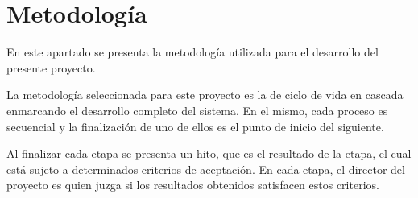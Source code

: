 \section{Metodología}

    \par
    En este apartado se presenta la metodología utilizada para el desarrollo del presente proyecto.
    \par La metodología seleccionada para este proyecto es la de ciclo de vida en cascada enmarcando el desarrollo completo del sistema. En el mismo, cada proceso es secuencial y la finalización de uno de ellos es el punto de inicio del siguiente.
    
    \par Al finalizar cada etapa se presenta un hito, que es el resultado de la etapa, el cual está sujeto a determinados criterios de aceptación. En cada etapa, el director del proyecto es quien juzga si los resultados obtenidos satisfacen estos criterios.
    \\ %
    \\
